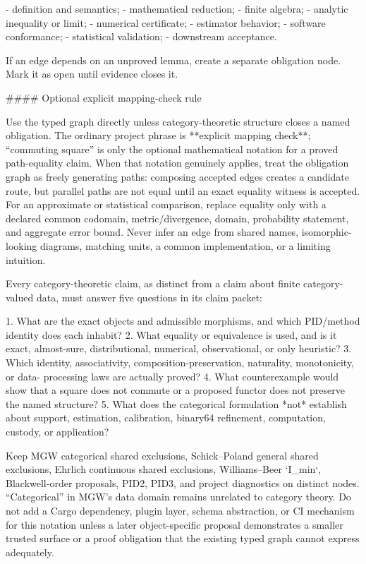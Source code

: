 \documentclass[11pt]{article}
\begin{document}
\begin{markdown}
- definition and semantics;
- mathematical reduction;
- finite algebra;
- analytic inequality or limit;
- numerical certificate;
- estimator behavior;
- software conformance;
- statistical validation;
- downstream acceptance.

If an edge depends on an unproved lemma, create a separate obligation node. Mark it as open until
evidence closes it.

#### Optional explicit mapping-check rule

Use the typed graph directly unless category-theoretic structure closes a named obligation. The
ordinary project phrase is **explicit mapping check**; “commuting square” is only the optional
mathematical notation for a proved path-equality claim. When that notation genuinely applies, treat
the obligation graph as freely generating paths: composing accepted edges creates a candidate
route, but parallel paths are not equal until an exact equality witness is accepted.
For an approximate or statistical comparison, replace equality only with a declared common
codomain, metric/divergence, domain, probability statement, and aggregate error bound. Never infer
an edge from shared names, isomorphic-looking diagrams, matching units, a common implementation,
or a limiting intuition.

Every category-theoretic claim, as distinct from a claim about finite category-valued data, must
answer five questions in its claim packet:

1. What are the exact objects and admissible morphisms, and which PID/method identity does each
   inhabit?
2. What equality or equivalence is used, and is it exact, almost-sure, distributional, numerical,
   observational, or only heuristic?
3. Which identity, associativity, composition-preservation, naturality, monotonicity, or data-
   processing laws are actually proved?
4. What counterexample would show that a square does not commute or a proposed functor does not
   preserve the named structure?
5. What does the categorical formulation *not* establish about support, estimation, calibration,
   binary64 refinement, computation, custody, or application?

Keep MGW categorical shared exclusions, Schick--Poland general shared exclusions, Ehrlich
continuous shared exclusions, Williams--Beer `I_min`, Blackwell-order proposals, PID2, PID3, and
project diagnostics on distinct nodes. “Categorical” in MGW's data domain remains unrelated to
category theory. Do not add a Cargo dependency, plugin layer, schema abstraction, or CI mechanism
for this notation unless a later object-specific proposal demonstrates a smaller trusted surface or
a proof obligation that the existing typed graph cannot express adequately.


\end{markdown}
\end{document}
